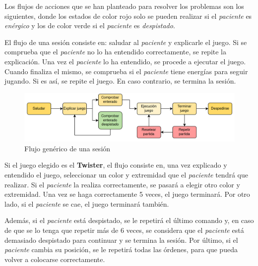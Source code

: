 \documentclass{uc3mpracticas}
\begin{document}
  \vspace{2mm}

  Los flujos de acciones que se han planteado para resolver los problemas son los siguientes, donde los estados de color rojo solo se pueden realizar si el \textit{paciente} es \textit{enérgico} y los de color verde si el \textit{paciente} es \textit{despistado}.


  \vspace{2mm}

  El flujo de una sesión consiste en: saludar al \textit{paciente} y explicarle el juego. Si se comprueba que el \textit{paciente} no lo ha entendido correctamente, se repite la explicación. Una vez el \textit{paciente} lo ha entendido, se procede a ejecutar el juego. Cuando finaliza el mismo, se comprueba si el \textit{paciente} tiene energías para seguir jugando. Si es así, se repite el juego. En caso contrario, se termina la sesión.

  \begin{figure}[!h]
    \centering
    \includegraphics[width=.85\linewidth]{Images/flujo1.png}
    \caption*{Flujo genérico de una sesión}
  \end{figure}

  Si el juego elegido es el \textbf{Twister}, el flujo consiste en, una vez explicado y entendido el juego, seleccionar un color y extremidad que el \textit{paciente} tendrá que realizar. Si el \textit{paciente} la realiza correctamente, se pasará a elegir otro color y extremidad. Una vez se haga correctamente 5 veces, el juego terminará. Por otro lado, si el \textit{paciente} se cae, el juego terminará también.

  \vspace{2mm}

  Además, si el \textit{paciente} está despistado, se le repetirá el último comando y, en caso de que se lo tenga que repetir más de 6 veces, se considera que el \textit{paciente} está demasiado despistado para continuar y se termina la sesión. Por último, si el \textit{paciente} cambia su posición, se le repetirá todas las órdenes, para que pueda volver a colocarse correctamente.
\end{document}
